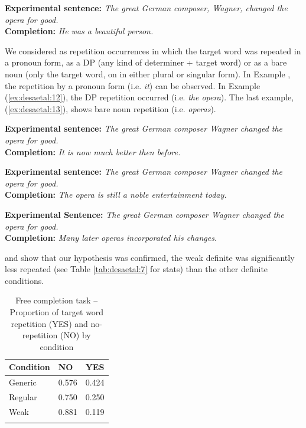 \documentclass[output=paper,
modfonts
]{langscibook}
\begin{document}
\ea \label{ex:desaetal:10}
\textbf{Experimental sentence:} \textit{The great German composer, Wagner, changed the opera for good.}
\\ \textbf{Completion:} \textit{He was a beautiful person.}
\z

We considered as repetition occurrences in which the target word was repeated in a pronoun form, as a DP (any kind of determiner + target word) or as a bare noun (only the target word, on in either plural or singular form). In Example , the repetition by a pronoun form (i.e. \textit{it}) can be observed. In Example (\ref{ex:desaetal:12}), the DP repetition occurred (i.e. \textit{the opera}). The last example, (\ref{ex:desaetal:13}), shows bare noun repetition (i.e. \textit{operas}).

\ea \label{ex:desaetal:11}
\textbf{Experimental sentence:} \textit{The great German composer Wagner changed the opera for good.}
\\ \textbf{Completion:} \textit{It is now much better then before.} 
\z

\ea \label{ex:desaetal:12}
\textbf{Experimental sentence:} \textit{The great German composer Wagner changed the opera for good.}	
\\ \textbf{Completion:} \textit{The opera is still a noble entertainment today.}
\z

\ea \label{ex:desaetal:13}
\textbf{Experimental Sentence:} \textit{The great German composer Wagner changed the opera for good.}
\\  \textbf{Completion:} \textit{Many later operas incorporated his changes.} 
\z

 and  show that our hypothesis was confirmed, the weak definite was significantly less repeated (see Table \ref{tab:desaetal:7} for stats) than the other definite conditions.

\begin{table}[p]
\centering
\caption{Free completion task -- Proportion of target word repetition (YES) and no-repetition (NO) by condition}
\label{tab:desaetal:6}
\begin{tabularx}{0.5\textwidth}{XXX}
\lsptoprule
{Condition} & {NO} & {YES} \\
\midrule
Generic & 0.576 & 0.424 \\ 
Regular & 0.750 & 0.250 \\ 
Weak & 0.881 & 0.119 \\
\lspbottomrule
\end{tabularx}
\end{table}
\end{document}
